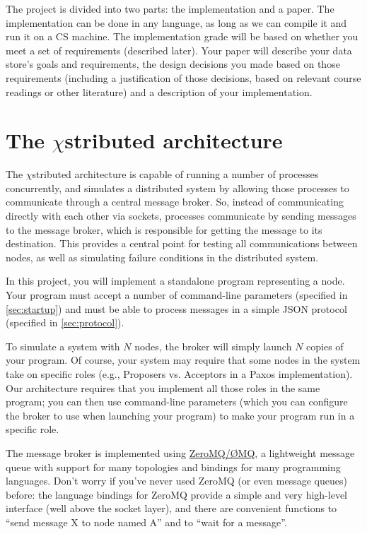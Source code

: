 \documentclass[12pt]{article}
\newcommand{\chistributed}{$\chi$\textsf{stributed} }
\begin{document}
The project is divided into two parts: the implementation and a paper. The implementation can be done in any language, as long as we can compile it and run it on a CS machine. The implementation grade will be based on whether you meet a set of requirements (described later). Your paper will describe your data store's goals and requirements, the design decisions you made based on those requirements (including a justification of those decisions, based on relevant course readings or other literature) and a description of your implementation.

\section{The \chistributed architecture}

The \chistributed architecture is capable of running a number of processes concurrently, and simulates a distributed system by allowing those processes to communicate through a central message broker. So, instead of communicating directly with each other via sockets, processes communicate by sending messages to the message broker, which is responsible for getting the message to its destination. This provides a central point for testing all communications between nodes, as well as simulating failure conditions in the distributed system.

In this project, you will implement a standalone program representing a node. Your program must accept a number of command-line parameters (specified in \cref{sec:startup}) and must be able to process messages in a simple JSON protocol (specified in \cref{sec:protocol}).

To simulate a system with $N$ nodes, the broker will simply launch $N$ copies of your program. Of course, your system may require that some nodes in the system take on specific roles (e.g., Proposers vs. Acceptors in a Paxos implementation). Our architecture requires that you implement all those roles in the same program; you can then use command-line parameters (which you can configure the broker to use when launching your program) to make your program run in a specific role.

The message broker is implemented using \href{http://zeromq.org/}{ZeroMQ/ØMQ}, a lightweight message queue with support for many topologies and bindings for many programming languages. Don't worry if you've never used ZeroMQ (or even message queues) before: the language bindings for ZeroMQ provide a simple and very high-level interface (well above the socket layer), and there are convenient functions to ``send message X to node named A'' and to ``wait for a message''.
\end{document}
